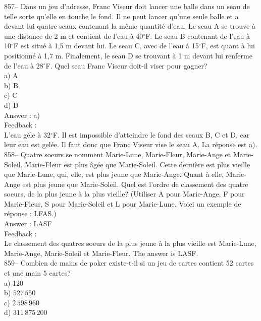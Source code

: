 \documentclass[letterpaper, 12pt]{article}
\begin{document}
857-- Dans un jeu d'adresse, Franc Viseur doit lancer une balle dans
un seau de telle sorte qu'elle en touche le fond.  Il ne peut lancer
qu'une seule balle et a devant lui quatre seaux contenant la m\^eme
quantit\'e d'eau.  Le seau A se trouve \`a une distance de 2 m et
contient de l'eau \`a 40$^{\circ}$F.  Le seau B contenant de l'eau
\`a 10$^{\circ}$F est situ\'e \`a 1,5 m devant lui.  Le seau C, avec
de l'eau \`a 15$^{\circ}$F, est quant \`a lui positionn\'e \`a 1,7
m. Finalement, le seau D se trouvant \`a 1 m devant lui renferme de
l'eau \`a 28$^{\circ}$F.
Quel seau Franc Viseur doit-il viser pour gagner?\\
a) A\\
b) B\\
c) C\\
d) D\\

Answer : a)\\

Feedback : \\
L'eau g\`ele \`a 32$^{\circ}$F.  Il est impossible d'atteindre le fond des
seaux B, C et D,
car leur eau est gel\'ee.  Il faut donc que Franc Viseur vise le seau A. La
r\'eponse est a).\\

858-- Quatre soeurs se nomment Marie-Lune, Marie-Fleur, Marie-Ange
et Marie-Soleil.  Marie-Fleur est plus \^ag\'ee que Marie-Soleil.
Cette derni\`ere est plus vieille que Marie-Lune, qui, elle, est
plus jeune que Marie-Ange.  Quant \`a elle, Marie-Ange est plus
jeune que Marie-Soleil. Quel est l'ordre de classement des quatre
soeurs, de la plus jeune \`a la plus vieille? (Utiliser A pour
Marie-Ange, F pour Marie-Fleur, S pour Marie-Soleil et L pour
Marie-Lune.
Voici un exemple de r\'eponse : LFAS.)\\

Answer : LASF\\

Feedback : \\
Le classement des quatres soeurs de la plus jeune \`a la plus vieille est
Marie-Lune, Marie-Ange, Marie-Soleil et Marie-Fleur.  The answer is
LASF.\\


859-- Combien de mains de poker existe-t-il si un jeu de cartes contient 52
cartes et une main 5 cartes?\\
a) 120\\
b) $527\,550$\\
c) $2\,598\,960$\\
d) $311\,875\,200$\\
\end{document}
